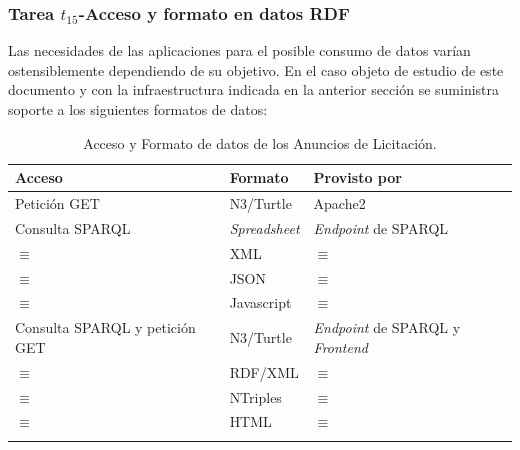 \subsubsection{Tarea $t_{15}$-Acceso y formato en datos RDF}\label{t15-comun}
Las necesidades de las aplicaciones para el posible consumo de datos varían ostensiblemente 
dependiendo de su objetivo. En el caso objeto de estudio de este documento y con la infraestructura 
indicada en la anterior sección se suministra soporte a los siguientes formatos de datos:

\begin{longtable}[c]{|p{4cm}|p{4cm}|p{4cm}|} 
\hline
  \textbf{Acceso} &  \textbf{Formato} &  \textbf{Provisto por}  \\\hline
\endhead
 Petición GET    & N3/Turtle    & Apache2 \\ \hline
 Consulta SPARQL & \textit{Spreadsheet}  & \textit{Endpoint} de SPARQL  \\ \hline
 $\equiv$        & XML 		& $\equiv$ \\ \hline
 $\equiv$        & JSON 	& $\equiv$ \\ \hline
 $\equiv$        & Javascript 	& $\equiv$  \\ \hline 
 Consulta SPARQL y petición GET      & N3/Turtle 	& \textit{Endpoint} de SPARQL y \linkeddata \textit{Frontend} \\ \hline
 $\equiv$        & RDF/XML 	& $\equiv$ \\ \hline
 $\equiv$        & NTriples 	& $\equiv$  \\ \hline
 $\equiv$        & HTML 	& $\equiv$  \\ \hline
 \hline
\caption{Acceso y Formato de datos de los Anuncios de Licitación.}\label{table:pscs-acceso}\\    
\end{longtable}


